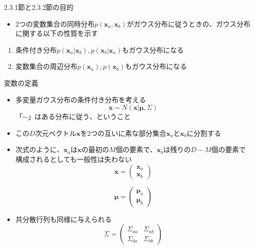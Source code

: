 \begin{frame}{2.3.1節と2.3.2節の目的}
 \begin{itemize}
  \item 2つの変数集合の同時分布$p(\bm{x}_a,\bm{x}_b)$がガウス分布に従うときの、ガウス分布に関する以下の性質を示す
 \end{itemize}
 \begin{enumerate}
  \item 条件付き分布$p(\bm{x}_a|\bm{x}_b),p(\bm{x}_b|\bm{x}_a)$もガウス分布になる
  \item 変数集合の周辺分布$p(\bm{x}_a),p(\bm{x}_b)$もガウス分布になる
 \end{enumerate}
\end{frame}

\begin{frame}{変数の定義}
 \begin{itemize}
  \item 多変量ガウス分布の条件付き分布を考える
        \begin{equation}
         \bm{x}\sim N(\bm{x}|\bm{\mu}, \Sigma)
        \end{equation}
        「$\sim$」はある分布に従う、ということ
  \item この$D$次元ベクトル$\bm{x}$を2つの互いに素な部分集合$\bm{x}_a$と$\bm{x}_b$に分割する
  \item 次式のように、$\bm{x}_a$は$\bm{x}$の最初の$M$個の要素で、$\bm{x}_b$は残りの$D-M$個の要素で構成されるとしても一般性は失わない
        \begin{equation}
         \bm{x} =
          \begin{pmatrix}
           \bm{x}_a \\
           \bm{x}_b
          \end{pmatrix}
        \end{equation}

        \begin{equation}
         \bm{\mu} =
          \begin{pmatrix}
           \bm{\mu}_a \\
           \bm{\mu}_b
          \end{pmatrix}
        \end{equation}
  \item 共分散行列も同様に与えられる
        \begin{equation}
         \Sigma =
          \begin{pmatrix}
           \Sigma_{aa} & \Sigma_{ab} \\
           \Sigma_{ba} & \Sigma_{bb}
          \end{pmatrix}
        \end{equation}
 \end{itemize}
\end{frame}

